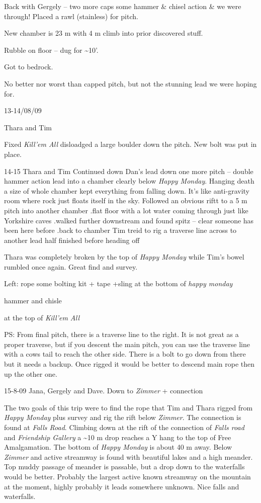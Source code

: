 Back with Gergely -- two more caps some hammer \& chisel action \& we
were through! Placed a rawl (stainless) for pitch.

New chamber is 23 m with 4 m climb into prior discovered stuff.

Rubble on floor -- dug for \textasciitilde 10'.

Got to bedrock.

No better nor worst than capped pitch, but not the stunning lead we were
hoping for.

13-14/08/09

Thara and Tim

Fixed \emph{Kill'em All} disloadged a large boulder down the pitch. New
bolt was put in place.

14-15 Thara and Tim Continued down Dan's lead down one more pitch --
double hammer action lead into a chamber clearly below \emph{Happy
Monday}. Hanging death a size of whole chamber kept everything from
falling down. It's like anti-gravity room where rock just floats itself
in the sky. Followed an obvious riftt to a 5 m pitch into another
chamber .flat floor with a lot water coming through just like Yorkshire
caves .walked further downstream and found spitz -- clear someone has
been here before .back to chamber Tim treid to rig a traverse line
across to another lead half finished before heading off

Thara was completely broken by the top of \emph{Happy Monday} while
Tim's bowel rumbled once again. Great find and survey.

Left: rope some bolting kit + tape +sling at the bottom of \emph{happy
monday}

hammer and chisle

at the top of \emph{Kill'em All}

PS: From final pitch, there is a traverse line to the right. It is not
great as a proper traverse, but if you descent the main pitch, you can
use the traverse line with a cows tail to reach the other side. There is
a bolt to go down from there but it needs a backup. Once rigged it would
be better to descend main rope then up the other one.

15-8-09 Jana, Gergely and Dave. Down to \emph{Zimmer} + connection

The two goals of this trip were to find the rope that Tim and Thara
rigged from \emph{Happy Monday} plus survey and rig the rift below
\emph{Zimmer}. The connection is found at \emph{Falls Road}. Climbing
down at the rift of the connection of \emph{Falls road} and
\emph{Friendship Gallery} a \textasciitilde 10 m drop reaches a Y hang
to the top of Free Amalgamation. The bottom of \emph{Happy Monday} is
about 40 m away. Below \emph{Zimmer} and active streamway is found with
beautiful lakes and a high meander. Top muddy passage of meander is
passable, but a drop down to the waterfalls would be better. Probably
the largest active known streamway on the mountain at the moment, highly
probably it leads somewhere unknown. Nice falls and waterfalls.

